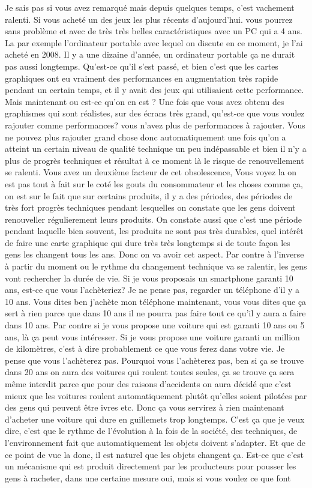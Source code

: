 \begin{small}
Je sais pas si vous avez remarqué mais depuis quelques temps, c'est vachement ralenti. Si vous acheté un des jeux les plus récents d'aujourd'hui. vous pourrez sans problème et avec de très très belles caractéristiques avec un PC qui a 4 ans. La par exemple l'ordinateur portable avec lequel on discute en ce moment, je l'ai acheté en 2008. Il y a une dizaine d'année, un ordinateur portable ça ne durait pas aussi longtemps. Qu'est-ce qu'il s'est passé, et bien c'est que les cartes graphiques ont eu vraiment des performances en augmentation très rapide pendant un certain temps, et il y avait des jeux qui utilisaient cette performance. Mais maintenant ou est-ce qu'on en est ? Une fois que vous avez obtenu des graphismes qui sont réalistes, sur des écrans très grand, qu'est-ce que vous voulez rajouter comme performances? vous n'avez plus de performances à rajouter. Vous ne pouvez plus rajouter grand chose donc automatiquement une fois qu'on a atteint un certain niveau de qualité technique un peu indépassable et bien il n'y a plus de progrès techniques et résultat à ce moment là le risque de renouvellement se ralenti. Vous avez un deuxième facteur de cet obsolescence, Vous voyez la on est pas tout à fait sur le coté les gouts du consommateur et les choses comme ça, on est sur le fait que sur certains produits, il y a des périodes, des périodes de très fort progrès techniques pendant lesquelles on constate que les gens doivent renouveller régulierement leurs produits. On constate aussi que c'est une période pendant laquelle bien souvent, les produits ne sont pas très durables, quel intérêt de faire une carte graphique qui dure très très longtemps si de toute façon les gens les changent tous les ans. Donc on va avoir cet aspect. Par contre à l'inverse à partir du moment ou le rythme du changement technique va se ralentir, les gens vont rechercher la durée de vie. Si je vous proposais un smartphone garanti 10 ans, est-ce que vous l'achèteriez? Je ne pense pas, regarder un téléphone d'il y a 10 ans. Vous dites ben j'achète mon téléphone maintenant, vous vous dites que ça sert à rien parce que dans 10 ans il ne pourra pas faire tout ce qu'il y aura a faire dans 10 ans. Par contre si je vous propose une voiture qui est garanti 10 ans ou 5 ans, là ça peut vous intéresser. Si je vous propose une voiture garanti un million de kilomètres, c'est à dire probablement ce que vous ferez dans votre vie. Je pense que vous l'achèterez pas. Pourquoi vous l'achèterez pas, ben si ça se trouve dans 20 ans on aura des voitures qui roulent toutes seules, ça se trouve ça sera même interdit parce que pour des raisons d'accidents on aura décidé que c'est mieux que les voitures roulent automatiquement plutôt qu'elles soient pilotées par des gens qui peuvent être ivres etc. Donc ça vous servirez à rien maintenant d'acheter une voiture qui dure en guillemets trop longtemps. C'est ça que je veux dire, c'est que le rythme de l'évolution à la fois de la société, des techniques, de l'environnement fait que automatiquement les objets doivent s'adapter. Et que de ce point de vue la donc, il est naturel que les objets changent ça. Est-ce que c'est un mécanisme qui est produit directement par les producteurs pour pousser les gens à racheter, dans une certaine mesure oui, mais si vous voulez ce que font 
\end{small}
